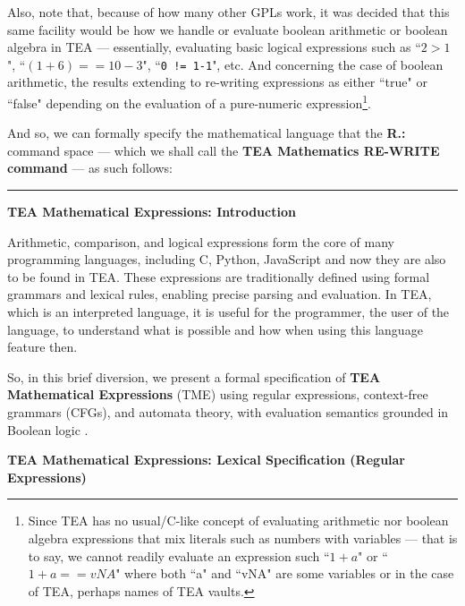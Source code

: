 \documentclass[a4paper, 18pt]{book} %
\begin{document}
{{{Also, note that, because of how many other GPLs work, it was decided that this same facility would be how we handle or evaluate boolean arithmetic or boolean algebra in TEA --- essentially, evaluating basic logical expressions such as ``$2 > 1$", ``$(1+6) == 10 - 3$", ``\verb|0 != 1-1|", etc. And concerning the case of boolean arithmetic, the results extending to re-writing expressions as either ``true" or ``false" depending on the evaluation of a pure-numeric expression\footnote{Since TEA has no usual/C-like concept of evaluating arithmetic nor boolean algebra expressions that mix literals such as numbers with variables --- that is to say, we cannot readily evaluate an expression such ``$1 + a$" or ``$1 + a == vNA$" where both ``a" and ``vNA" are some variables or in the case of TEA, perhaps names of TEA vaults.}.


\vspace{2em}

And so, we can formally specify the mathematical language that the \textbf{R.:} command space --- which we shall call the \textbf{TEA Mathematics RE-WRITE command} --- as such follows:

\noindent\rule{\textwidth}{0.4pt}

{
\normalsize

\textbf{TEA Mathematical Expressions: Introduction}

Arithmetic, comparison, and logical expressions form the core of many programming languages, including C, Python, JavaScript and now they are also to be found in TEA. These expressions are traditionally defined using formal grammars and lexical rules, enabling precise parsing and evaluation. In TEA, which is an interpreted language, it is useful for the programmer, the user of the language, to understand what is possible and how when using this language feature then.

\vspace{1em}

So, in this brief diversion, we present a formal specification of \textbf{TEA Mathematical Expressions} (TME) using regular expressions, context-free grammars (CFGs), and automata theory, with evaluation semantics grounded in Boolean logic \cite{aho2006compilers,scott2021pragmatics,felleisen2001semantics}.

\vspace{1em}

\textbf{TEA Mathematical Expressions: Lexical Specification (Regular Expressions)}

}}}}
\end{document}
